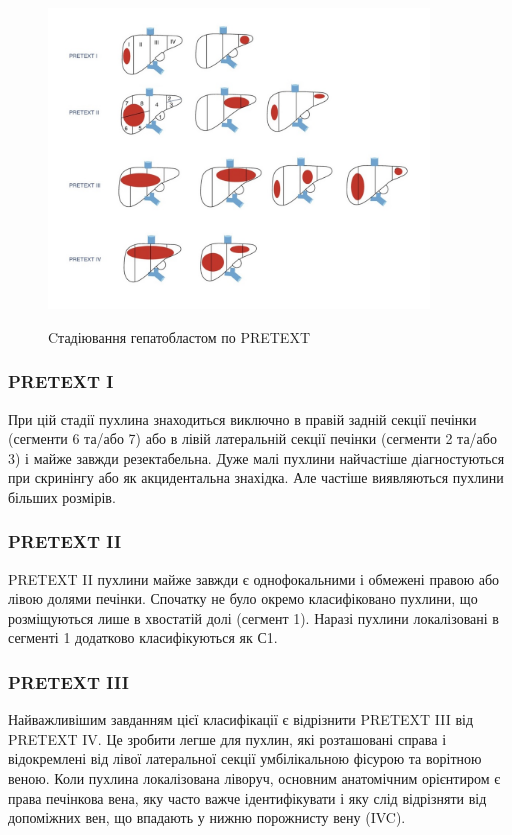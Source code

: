 \begin{figure}[h]
\centering
\includegraphics[width=0.9\textwidth]{Illustrations/pretexmal.jpg}
\label{fig:pretexmal} %
\caption{Cтадіювання гепатобластом по PRETEXT}
\end{figure}

\subsubsection{PRETEXT I}
При цій стадії пухлина знаходиться виключно в правій задній секції печінки (сегменти 6 та/або 7)  або в лівій латеральній секції печінки (сегменти 2 та/або 3) і майже завжди резектабельна. Дуже малі пухлини найчастіше діагностуються при скринінгу або як акцидентальна знахідка. Але частіше виявляються пухлини більших розмірів. 
\subsubsection{PRETEXT II}
PRETEXT II  пухлини майже завжди є однофокальними і обмежені правою або лівою долями печінки. Спочатку не було окремо класифіковано пухлини, що розміщуються лише в хвостатій долі (сегмент 1). Наразі пухлини локалізовані в сегменті 1 додатково класифікуються як С1.
\subsubsection{PRETEXT III}
Найважливішим завданням цієї класифікації є відрізнити PRETEXT III від PRETEXT IV. Це зробити легше для пухлин, які розташовані справа і відокремлені від лівої латеральної секції умбілікальною фісурою та ворітною веною. Коли пухлина локалізована ліворуч, основним анатомічним орієнтиром є права печінкова вена, яку часто важче ідентифікувати і яку слід відрізняти від допоміжних вен, що впадають у нижню порожнисту вену (IVC).

